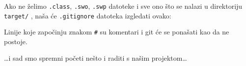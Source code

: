 Ako ne želimo \verb+.class+, \verb+.swo+, \verb+.swp+ datoteke i sve ono što se nalazi u direktoriju \verb+target/+ , naša će \verb+.gitignore+ datoteka izgledati ovako:

\gitoutputcommand{%
\color{gray}{\# Vim privremene datoteke:}\\
\color{black}{*.swp}\\
\color{black}{*.swo}\\
\color{gray}{\# Java kompajlirane klase:}\\
\color{black}{*.class}\\
\color{gray}{\# Output direktorij s rezultatima kompajliranja i builda:}\\
\color{black}{target/*}%
}

Linije koje započinju znakom \verb+#+ su komentari i git će se ponašati kao da ne postoje.

\dots{}i sad smo spremni početi nešto i raditi s našim projektom\dots


